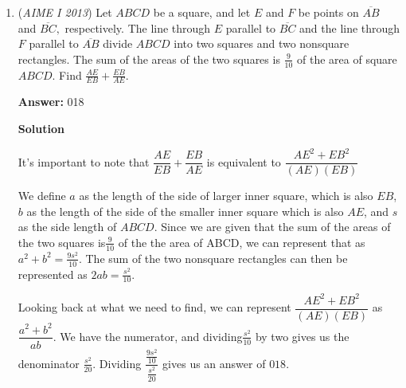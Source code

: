 \begin{enumerate}
Again, from the first two conditions we know the number takes the form $\overline{5xyz5}$, and the third condition implies that $5|(x+y+z)$. Assume that $x$, $y$, and $z$ are less than 5. Now, we will proceed with casework on the sum $x+y+z$. 

 Case 1: $x+y+z=0$. Since $x$, $y$, and $z$ are nonnegative, there is only $1$.

 Case 2: $x+y+z=5$. Using stars and bars, we obtain $\binom{5+3-1}{3-1} = 21$. However, we assumed $x, y, z < 5$, so we subract 3 to get 18.

 Case 3: $x+y+z=10$. Our only possible triplets are $(4, 4, 2)$ and $(4, 3, 3)$ and their rearrangements, totalling $3 \cdot 2 = 6$.

 Due to our assumption that $x, y, z < 5$, $x+y+z$ cannot be 15, so our casework is done. Summing, we find a total of $1+18+6=25$. However, for each of $x$, $y$, and $z$, we can add $5$ without violating the conditions. So, we can either choose to add $5$ or not, so we have to multiply $2$ to our cases three times for $x$, $y$, and $z$. This yields $25 \cdot 2 \cdot 2 \cdot 2 = \boxed{200}$.

 


	\item (\textit{AIME I 2013}) Let $ABCD$ be a square, and let $E$ and $F$ be points on $\overline{AB}$ and $\overline{BC},$ respectively. The line through $E$ parallel to $\overline{BC}$ and the line through $F$ parallel to $\overline{AB}$ divide $ABCD$ into two squares and two nonsquare rectangles. The sum of the areas of the two squares is $\frac{9}{10}$ of the area of square $ABCD.$ Find $\frac{AE}{EB} + \frac{EB}{AE}.$

 \textbf{Answer: }018



\textbf{Solution}

It's important to note that $\dfrac{AE}{EB} + \dfrac{EB}{AE}$ is equivalent to $\dfrac{AE^2 + EB^2}{(AE)(EB)}$

 We define $a$ as the length of the side of larger inner square, which is also $EB$, $b$ as the length of the side of the smaller inner square which is also $AE$, and $s$ as the side length of $ABCD$. Since we are given that the sum of the areas of the two squares is$\frac{9}{10}$ of the the area of ABCD, we can represent that as $a^2 + b^2 = \frac{9s^2}{10}$. The sum of the two nonsquare rectangles can then be represented as $2ab  = \frac{s^2}{10}$. 

 Looking back at what we need to find, we can represent $\dfrac{AE^2 + EB^2}{(AE)(EB)}$ as $\dfrac{a^2 + b^2}{ab}$. We have the numerator, and dividing$\frac{s^2}{10}$ by two gives us the denominator $\frac{s^2}{20}$. Dividing $\dfrac{\frac{9s^2}{10}}{\frac{s^2}{20}}$ gives us an answer of $\boxed{018}$.


\end{enumerate}
